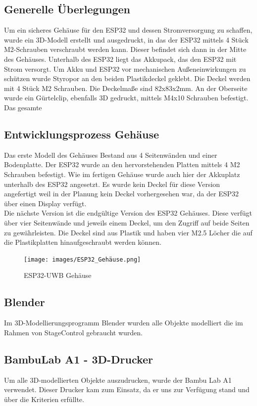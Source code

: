 \subsection{Generelle Überlegungen}
Um ein sicheres Gehäuse für den ESP32 und dessen Stromversorgung zu schaffen, wurde ein 3D-Modell erstellt und ausgedruckt, in das der ESP32 mittels 4 Stück M2-Schrauben verschraubt werden kann. Dieser befindet sich dann in der Mitte des Gehäuses. Unterhalb des ESP32 liegt das Akkupack, das den ESP32 mit Strom versorgt.
Um Akku und ESP32 vor  mechanischen Außeneinwirkungen zu schützen wurde Styropor an den beiden Plastikdeckel geklebt. Die Deckel werden mit 4 Stück M2 Schrauben. 
Die Deckelmaße sind 82x83x2mm. An der Oberseite wurde ein Gürtelclip, ebenfalls 3D gedruckt, mittels M4x10 Schrauben befestigt. Das gesamte 

\subsection{Entwicklungsprozess Gehäuse}
Das erste Modell des Gehäuses Bestand aus 4 Seitenwänden und einer Bodenplatte. Der ESP32 wurde an den hervorstehenden Platten mittels 4 M2 Schrauben befestigt. Wie im fertigen Gehäuse wurde auch hier der Akkuplatz unterhalb des ESP32 angesetzt. Es wurde kein Deckel für diese Version angefertigt weil in der Planung kein Deckel vorhergesehen war, da der ESP32 über einen Display verfügt. \\
Die nächste Version ist die endgültige Version des ESP32 Gehäuses. Diese verfügt über vier Seitenwände und jeweils einem Deckel, um den Zugriff auf beide Seiten zu gewährleisten. Die Deckel sind aus Plastik und haben vier M2.5 Löcher die auf die Plastikplatten hinaufgeschraubt werden können.

\begin{figure}[H]
	\centering
	\texttt{[image: images/ESP32\_Gehäuse.png]}
	\caption[ESP32-UWB Gehäuse]{ESP32-UWB Gehäuse}
	\label{fig:ESP32-UWB Gehäuse}
\end{figure}


\subsection{Blender}
Im 3D-Modellierungsprogramm Blender wurden alle Objekte modelliert die im Rahmen von StageControl gebraucht wurden. 

\subsection{BambuLab A1 - 3D-Drucker}
Um alle 3D-modellierten Objekte auszudrucken, wurde der Bambu Lab A1 verwendet. Dieser Drucker kam zum Einsatz, da er uns zur Verfügung stand und über die Kriterien erfüllte.

